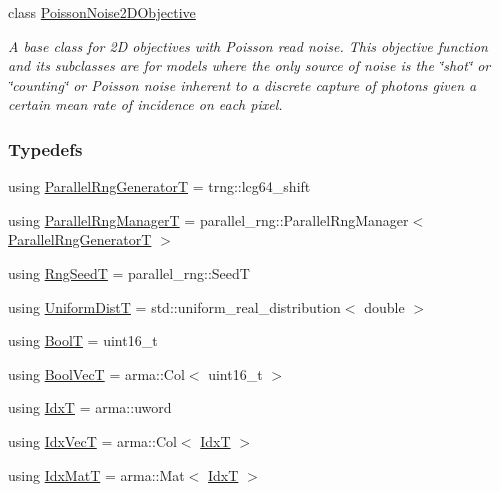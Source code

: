 \begin{DoxyCompactItemize}
class \hyperlink{classmappel_1_1PoissonNoise2DObjective}{Poisson\+Noise2\+D\+Objective}
\begin{DoxyCompactList}\small\item\em A base class for 2D objectives with Poisson read noise. This objective function and its subclasses are for models where the only source of noise is the \char`\"{}shot\char`\"{} or \char`\"{}counting\char`\"{} or Poisson noise inherent to a discrete capture of photons given a certain mean rate of incidence on each pixel. \end{DoxyCompactList}\end{DoxyCompactItemize}
\subsubsection*{Typedefs}
\begin{DoxyCompactItemize}
\item 
using \hyperlink{namespacemappel_ad1e99b214465229065d30f881a89d1cc}{Parallel\+Rng\+GeneratorT} = trng\+::lcg64\+\_\+shift
\item 
using \hyperlink{namespacemappel_acf276a4212f07b1ed4cb2ddce379ba1d}{Parallel\+Rng\+ManagerT} = parallel\+\_\+rng\+::\+Parallel\+Rng\+Manager$<$ \hyperlink{namespacemappel_ad1e99b214465229065d30f881a89d1cc}{Parallel\+Rng\+GeneratorT} $>$
\item 
using \hyperlink{namespacemappel_a318bca259a7add5979160939a3f4e60b}{Rng\+SeedT} = parallel\+\_\+rng\+::\+SeedT
\item 
using \hyperlink{namespacemappel_ac559959896fbdf3a8ce294353ea41aff}{Uniform\+DistT} = std\+::uniform\+\_\+real\+\_\+distribution$<$ double $>$
\item 
using \hyperlink{namespacemappel_a74f3ebfb073cdde8b57926847deb4daa}{BoolT} = uint16\+\_\+t
\item 
using \hyperlink{namespacemappel_a167d761ecce3cafb6f98c00c16bdb523}{Bool\+VecT} = arma\+::\+Col$<$ uint16\+\_\+t $>$
\item 
using \hyperlink{namespacemappel_ab17ec0f30b61ece292439d7ece81d3a8}{IdxT} = arma\+::uword
\item 
using \hyperlink{namespacemappel_ac63743dcd42180127307cd0e4ecdd784}{Idx\+VecT} = arma\+::\+Col$<$ \hyperlink{namespacemappel_ab17ec0f30b61ece292439d7ece81d3a8}{IdxT} $>$
\item 
using \hyperlink{namespacemappel_a08989eafa9aeb1a4c3ec773614297d0d}{Idx\+MatT} = arma\+::\+Mat$<$ \hyperlink{namespacemappel_ab17ec0f30b61ece292439d7ece81d3a8}{IdxT} $>$
\item 

\end{DoxyCompactItemize}
